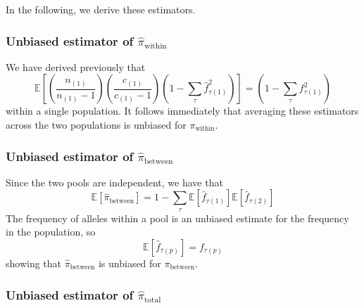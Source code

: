 \documentclass[a4paper,fontsize=9pt,DIV=14]{scrartcl}
\newcommand{\coverage}{c}
\newcommand{\empfreq}{\widehat{f}}
\begin{document}
In the following, we derive these estimators.


\subsubsection*{Unbiased estimator of \texorpdfstring{$\widehat{\pi}_\text{within}$}{Pi Within}}
\label{supp:sec:FST:sub:EstimatorsPi:sub:PiWithin}

We have derived previously that
\[
\mathbb{E}\left[\left(\frac{n_{(1)}}{n_{(1)}-1}\right)\left(\frac{\coverage_{(1)}}{\coverage_{(1)}-1}\right)\left(1 - \sum_{\tau}\empfreq_{\tau(1)}^2\right) \right] = \left(1 - \sum_\tau f_{\tau(1)}^2\right)
\]
within a single population.  It follows immediately that averaging these estimators across the two populations is unbiased for $\pi_\text{within}$.


\subsubsection*{Unbiased estimator of \texorpdfstring{$\widehat{\pi}_\text{between}$}{Pi Between}}
\label{supp:sec:FST:sub:EstimatorsPi:sub:PiBetween}

Since the two pools are independent, we have that
\[
\mathbb{E}\left[\widehat{\pi}_\text{between}\right] = 1- \sum_\tau \mathbb{E}\left[\empfreq_{\tau(1)}\right]\mathbb{E}\left[\empfreq_{\tau(2)}\right]
\]
The frequency of alleles within a pool is an unbiased estimate for the frequency in the population, so
\[
\mathbb{E}\left[\empfreq_{\tau(p)}\right] = f_{\tau(p)}
\]
showing that $\widehat{\pi}_\text{between}$ is unbiased for $\pi_\text{between}$.


\subsubsection*{Unbiased estimator of \texorpdfstring{$\widehat{\pi}_\text{total}$}{Pi Total}}
\label{supp:sec:FST:sub:EstimatorsPi:sub:PiTotal}
\end{document}
